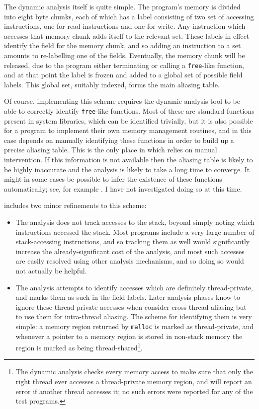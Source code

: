 The dynamic analysis itself is quite simple.  The program's memory is
divided into eight byte chunks, each of which has a label consisting
of two set of accessing instructions, one for read instructions and
one for write.  Any instruction which accesses that memory chunk adds
itself to the relevant set.  These labels in effect identify the field
for the memory chunk, and so adding an instruction to a set amounts to
re-labelling one of the fields.  Eventually, the memory chunk will be
released, due to the program either terminating or calling a
\verb|free|-like function, and at that point the label is frozen and
added to a global set of possible field labels.  This global set,
suitably indexed, forms the main aliasing table.

Of course, implementing this scheme requires the dynamic analysis tool
to be able to correctly identify \verb|free|-like functions.  Most of
these are standard functions present in system libraries, which can be
identified trivially, but it is also possible for a program to
implement their own memory management routines, and in this case
{\technique} depends on manually identifying these functions in order
to build up a precise aliasing table.  This is the only place in which
{\technique} relies on manual intervention.  If this information is
not available then the aliasing table is likely to be highly
inaccurate and the analysis is likely to take a long time to converge.
It might in some cases be possible to infer the existence of these
functions automatically; see, for example .  I have not
investigated doing so at this time.

{\Implementation} includes two minor refinements to this scheme:

\begin{itemize}
\item
  The analysis does not track accesses to the stack, beyond simply
  noting which instructions accessed the stack.  Most programs include
  a very large number of stack-accessing instructions, and so tracking
  them as well would significantly increase the already-significant
  cost of the analysis, and most such accesses are easily resolved
  using other analysis mechanisms, and so doing so would not actually
  be helpful.
\item
  The analysis attempts to identify accesses which are definitely
  thread-private, and marks them as such in the field labels.  Later
  analysis phases know to ignore these thread-private accesses when
  consider cross-thread aliasing but to use them for intra-thread
  aliasing.  The scheme for identifying them is very simple: a memory
  region returned by \verb|malloc| is marked as thread-private, and
  whenever a pointer to a memory region is stored in non-stack memory
  the region is marked as being thread-shared\footnote{The dynamic
    analysis checks every memory access to make sure that only the
    right thread ever accesses a thread-private memory region, and
    will report an error if another thread accesses it; no such errors
    were reported for any of the test programs.}.
\end{itemize}


